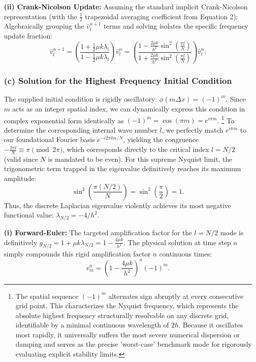 \begin{solution}
\textbf{(ii) Crank-Nicolson Update:}
Assuming the standard implicit Crank-Nicolson representation (with the $\frac{1}{2}$ trapezoidal averaging coefficient from Equation 2):
Algebraically grouping the $\hat{v}_l^{n+1}$ terms and solving isolates the specific frequency update fraction:
\[
\hat{v}_l^{n+1} = \left( \frac{1 + \frac{1}{2} \mu k \lambda_l}{1 - \frac{1}{2} \mu k \lambda_l} \right) \hat{v}_l^n = \left( \frac{1 - \frac{2 \mu k}{h^2} \sin^2\left(\frac{\pi l}{N}\right)}{1 + \frac{2 \mu k}{h^2} \sin^2\left(\frac{\pi l}{N}\right)} \right) \hat{v}_l^n.
\]

\subsubsection*{(c) Solution for the Highest Frequency Initial Condition}
The supplied initial condition is rigidly oscillatory: $\phi(m \Delta x) = (-1)^m$. Since $m$ acts as an integer spatial index, we can dynamically express this condition in complex exponential form identically as $(-1)^m = \cos(\pi m) = e^{i \pi m}$.
\footnote{The spatial sequence $(-1)^m$ alternates sign abruptly at every consecutive grid point. This characterizes the Nyquist frequency, which represents the absolute highest frequency structurally resolvable on any discrete grid, identifiable by a minimal continuous wavelength of $2h$. Because it oscillates most rapidly, it universally suffers the most severe numerical dispersion or damping and serves as the precise 'worst-case' benchmark mode for rigorously evaluating explicit stability limits.}
To determine the corresponding internal wave number $l$, we perfectly match $e^{i \pi m}$ to our foundational Fourier basis $e^{-i 2\pi l m / N}$, yielding the congruence $-\frac{2\pi l}{N} \equiv \pi \pmod{2\pi}$, which corresponds directly to the critical index $l = N/2$ (valid since $N$ is mandated to be even). For this supreme Nyquist limit, the trigonometric term trapped in the eigenvalue definitively reaches its maximum amplitude:
\[
\sin^2\left( \frac{\pi (N/2)}{N} \right) = \sin^2\left( \frac{\pi}{2} \right) = 1.
\]
Thus, the discrete Laplacian eigenvalue violently achieves its most negative functional value: $\lambda_{N/2} = -4/h^2$.

\textbf{(i) Forward-Euler:}
The targeted amplification factor for the $l = N/2$ mode is definitively $g_{N/2} = 1 + \mu k \lambda_{N/2} = 1 - \frac{4 \mu k}{h^2}$. The physical solution at time step $n$ simply compounds this rigid amplification factor $n$ continuous times:
\[
v_m^n = \left( 1 - \frac{4 \mu k}{h^2} \right)^n (-1)^m.
\]


\end{solution}
